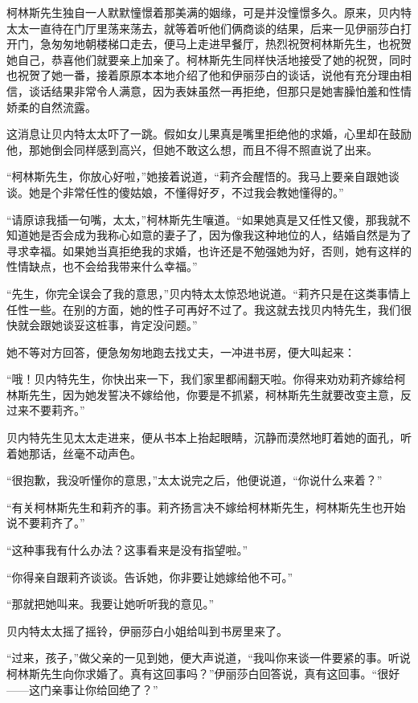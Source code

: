 \par 柯林斯先生独自一人默默憧憬着那美满的姻缘，可是并没憧憬多久。原来，贝内特太太一直待在门厅里荡来荡去，就等着听他们俩商谈的结果，后来一见伊丽莎白打开门，急匆匆地朝楼梯口走去，便马上走进早餐厅，热烈祝贺柯林斯先生，也祝贺她自己，恭喜他们就要亲上加亲了。柯林斯先生同样快活地接受了她的祝贺，同时也祝贺了她一番，接着原原本本地介绍了他和伊丽莎白的谈话，说他有充分理由相信，谈话结果非常令人满意，因为表妹虽然一再拒绝，但那只是她害臊怕羞和性情娇柔的自然流露。
\par 这消息让贝内特太太吓了一跳。假如女儿果真是嘴里拒绝他的求婚，心里却在鼓励他，那她倒会同样感到高兴，但她不敢这么想，而且不得不照直说了出来。
\par “柯林斯先生，你放心好啦，”她接着说道，“莉齐会醒悟的。我马上要亲自跟她谈谈。她是个非常任性的傻姑娘，不懂得好歹，不过我会教她懂得的。”
\par “请原谅我插一句嘴，太太，”柯林斯先生嚷道。“如果她真是又任性又傻，那我就不知道她是否会成为我称心如意的妻子了，因为像我这种地位的人，结婚自然是为了寻求幸福。如果她当真拒绝我的求婚，也许还是不勉强她为好，否则，她有这样的性情缺点，也不会给我带来什么幸福。”
\par “先生，你完全误会了我的意思，”贝内特太太惊恐地说道。“莉齐只是在这类事情上任性一些。在别的方面，她的性子可再好不过了。我这就去找贝内特先生，我们很快就会跟她谈妥这桩事，肯定没问题。”
\par 她不等对方回答，便急匆匆地跑去找丈夫，一冲进书房，便大叫起来：
\par “哦！贝内特先生，你快出来一下，我们家里都闹翻天啦。你得来劝劝莉齐嫁给柯林斯先生，因为她发誓决不嫁给他，你要是不抓紧，柯林斯先生就要改变主意，反过来不要莉齐。”
\par 贝内特先生见太太走进来，便从书本上抬起眼睛，沉静而漠然地盯着她的面孔，听着她那话，丝毫不动声色。
\par “很抱歉，我没听懂你的意思，”太太说完之后，他便说道，“你说什么来着？”
\par “有关柯林斯先生和莉齐的事。莉齐扬言决不嫁给柯林斯先生，柯林斯先生也开始说不要莉齐了。”
\par “这种事我有什么办法？这事看来是没有指望啦。”
\par “你得亲自跟莉齐谈谈。告诉她，你非要让她嫁给他不可。”
\par “那就把她叫来。我要让她听听我的意见。”
\par 贝内特太太摇了摇铃，伊丽莎白小姐给叫到书房里来了。
\par “过来，孩子，”做父亲的一见到她，便大声说道，“我叫你来谈一件要紧的事。听说柯林斯先生向你求婚了。真有这回事吗？”伊丽莎白回答说，真有这回事。“很好——这门亲事让你给回绝了？”
